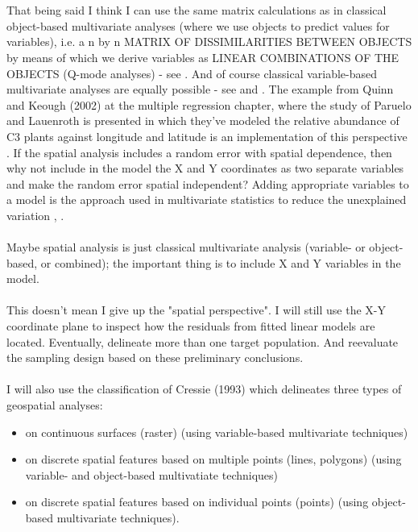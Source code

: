 \documentclass {article}
\begin{document}
\\
\\
That being said I think I can use the same matrix calculations as in classical object-based multivariate analyses (where we use objects to predict values for variables), i.e. a n by n MATRIX OF DISSIMILARITIES BETWEEN OBJECTS by means of which we derive variables as LINEAR COMBINATIONS OF THE OBJECTS (Q-mode analyses) - see \cite{quinn_experimental_2002}.  
And of course classical variable-based multivariate analyses are equally possible - see \cite{quinn_experimental_2002} and \cite{carroll_mathematical_1997}. 
The example from Quinn and Keough (2002) at the multiple regression chapter, where the study of Paruelo and Lauenroth is presented in which they've modeled the relative abundance of C3 plants against longitude and latitude is an implementation of this perspective \cite{paruelo_relative_1996}.
 If the spatial analysis includes a random error with spatial dependence, then why not include in the model the X and Y coordinates as two separate variables and make the random error spatial independent? Adding appropriate variables to a model is the approach used in multivariate statistics to reduce the unexplained variation \cite{quinn_experimental_2002} , \cite{carroll_mathematical_1997}.
\\
\\
Maybe spatial analysis is just classical multivariate analysis (variable- or object-based, or combined); the important thing is to include X and Y variables in the model.
\\
\\
This doesn't mean I give up the "spatial perspective". I will still use the X-Y coordinate plane to inspect how the residuals from fitted linear models are located. Eventually, delineate more than one target population. And reevaluate the sampling design based on these preliminary conclusions.
\\
\\
I will also use the classification of Cressie (1993) \cite{cressie_statistics_1993} which delineates three types of geospatial analyses:
\begin{itemize}
\item on continuous surfaces (raster) (using variable-based multivariate techniques)
\item on discrete spatial features based on multiple points (lines, polygons) (using variable- and object-based multivatiate techniques)
\item on discrete spatial features based on individual points (points) (using object-based multivariate techniques).
\end{itemize}
\end{document}
